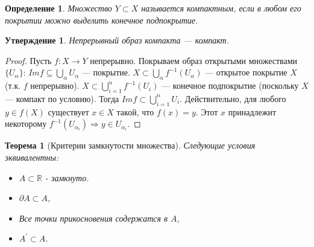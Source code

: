 \documentclass[12pt]{article}
\theoremstyle{plain}
\newtheorem{theorem}{Теорема}[section]
\newtheorem{subtheorem}{Утверждение}[section]
\newtheorem{definition}{Определение}[section]
\newcommand{\R}{\mathbb R}
\begin{document}
    \begin{definition}
        Множество $Y\subset X$ называется компактным, если в любом его покрытии можно выделить конечное подпокрытие.
    \end{definition}
    \begin{subtheorem}
        Непрерывный образ компакта --- компакт.
    \end{subtheorem}
    \begin{proof}
        Пусть $f: X \to Y$ непрерывно. Покрываем образ открытыми множествами $\{U_{\alpha}\}$: $Im f \subseteq \bigcup\limits_{\alpha} U_{\alpha}$ — покрытие.
        $X \subset \bigcup\limits_{\alpha} f^{-1}(U_{\alpha})$ — открытое покрытие $X$ (т.к. $f$ непрерывно).
        $X \subset \bigcup\limits_{i = 1}^{n} f^{-1}(U_{i})$ — конечное подпокрытие (поскольку $X$ — компакт по условию).
        Тогда $Imf \subset \bigcup\limits_{i = 1}^n U_{i}$. Действительно, для любого $y \in f(X)$ существует $x \in X$ такой, что $f(x) = y$. Этот $x$ принадлежит некоторому $f^{-1}(U_{\alpha_i}) \Longrightarrow y \in U_{\alpha_i}$.
    \end{proof}
    \begin{theorem} [Критерии замкнутости множества]
        Следующие условия эквивалентны:
        \begin{itemize}
            \item[(0)] $A\subset \R$ - замкнуто. 
            \item[(1)] $\partial A\subset A$,
            \item[(2)] Все точки прикосновения содержатся в $A$,
            \item[(3)] $A^{\prime}\subset A$.
        \end{itemize}
    \end{theorem}
\end{document}
